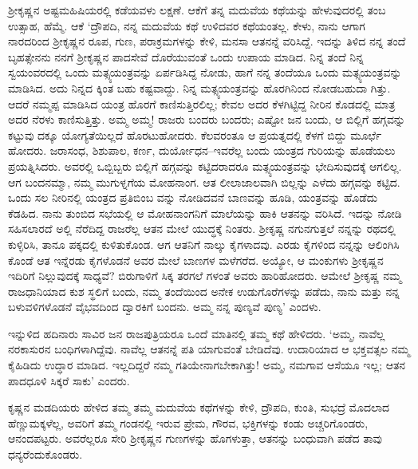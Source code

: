 ಶ್ರೀಕೃಷ್ಣನ ಅಷ್ಟಮಹಿಷಿಯರಲ್ಲಿ ಕಡೆಯವಳು ಲಕ್ಷಣೆ. ಆಕೆಗೆ ತನ್ನ ಮದುವೆಯ ಕಥೆಯನ್ನು ಹೇಳುವುದರಲ್ಲಿ ತಂಬ ಉತ್ಸಾಹ, ಹೆಮ್ಮೆ. ಆಕೆ ‘ದ್ರೌಪದಿ, ನನ್ನ ಮದುವೆಯ ಕಥೆ ಉಳಿದವರ ಕಥೆಯಂತಲ್ಲ. ಕೇಳು, ನಾನು ಆಗಾಗ ನಾರದರಿಂದ ಶ್ರೀಕೃಷ್ಣನ ರೂಪ, ಗುಣ, ಪರಾಕ್ರಮಗಳನ್ನು ಕೇಳಿ, ಮನಸಾ ಆತನನ್ನೆ ವರಿಸಿದ್ದೆ. ಇದನ್ನು ತಿಳಿದ ನನ್ನ ತಂದೆ ಬೃಹತ್ಸೇನನು ನನಗೆ ಶ್ರೀಕೃಷ್ಣನ ಪಾದಸೇವೆ ದೊರೆಯುವಂತೆ ಒಂದು ಉಪಾಯ ಮಾಡಿದ. ನಿನ್ನ ತಂದೆ ನಿನ್ನ ಸ್ವಯಂವರದಲ್ಲಿ ಒಂದು ಮತ್ಸ್ಯಯಂತ್ರವನ್ನು ಏರ್ಪಡಿಸಿದ್ದ ನೋಡು, ಹಾಗೆ ನನ್ನ ತಂದೆಯೂ ಒಂದು ಮತ್ಸ್ಯಯಂತ್ರವನ್ನು ಮಾಡಿಸಿದ. ಅದು ನಿನ್ನದ ಕ್ಕಿಂತ ಬಹು ಕಷ್ಟವಾದ್ದು. ನಿನ್ನ ಮತ್ಸ್ಯಯಂತ್ರವನ್ನು ಹೊರಗಿನಿಂದ ನೋಡಬಹುದಾ ಗಿತ್ತು. ಆದರೆ ನಮ್ಮಪ್ಪ ಮಾಡಿಸಿದ ಯಂತ್ರ ಹೊರಗೆ ಕಾಣಿಸುತ್ತಿರಲಿಲ್ಲ; ಕೇವಲ ಅದರ ಕೆಳಗಿಟ್ಟಿದ್ದ ನೀರಿನ ಕೊಡದಲ್ಲಿ ಮಾತ್ರ ಅದರ ನೆರಳು ಕಾಣಿಸುತ್ತಿತ್ತು. ಅಮ್ಮ ಅಮ್ಮ! ರಾಜರು ಬಂದರು ಬಂದರು; ಎಷ್ಟೋ ಜನ ಬಂದು, ಆ ಬಿಲ್ಲಿಗೆ ಹಗ್ಗವನ್ನು ಕಟ್ಟುವು ದಕ್ಕೂ ಯೋಗ್ಯತೆಯಿಲ್ಲದೆ ಹೊರಟುಹೋದರು. ಕೆಲವರಂತೂ ಆ ಪ್ರಯತ್ನದಲ್ಲಿ ಕೆಳಗೆ ಬಿದ್ದು ಮೂರ್ಛೆ ಹೋದರು. ಜರಾಸಂಧ, ಶಿಶುಪಾಲ, ಕರ್ಣ, ದುರ್ಯೋಧನ–ಇವರೆಲ್ಲ ಬಂದು ಯಂತ್ರದ ಗುರಿಯನ್ನು ಹೊಡೆಯಲು ಪ್ರಯತ್ನಿಸಿದರು. ಅವರಲ್ಲಿ ಒಬ್ಬಿಬ್ಬರು ಬಿಲ್ಲಿಗೆ ಹಗ್ಗವನ್ನು ಕಟ್ಟಿದರಾದರೂ ಮತ್ಸ್ಯಯಂತ್ರವನ್ನು ಭೇದಿಸುವುದಕ್ಕೆ ಆಗಲಿಲ್ಲ. ಆಗ ಬಂದನಮ್ಮಾ, ನಮ್ಮ ಮುಗುಳ್ನಗೆಯ ಮೋಹನಾಂಗ. ಆತ ಲೀಲಾಜಾಲವಾಗಿ ಬಿಲ್ಲನ್ನು ಎಳೆದು ಹಗ್ಗವನ್ನು ಕಟ್ಟಿದ. ಒಂದು ಸಲ ನೀರಿನಲ್ಲಿ ಯಂತ್ರದ ಪ್ರತಿಬಿಂಬ ವನ್ನು ನೋಡಿದವನೆ ಬಾಣವನ್ನು ಹೂಡಿ, ಯಂತ್ರವನ್ನು ಹೊಡೆದು ಕೆಡಹಿದ. ನಾನು ತುಂಬಿದ ಸಭೆಯಲ್ಲಿ ಆ ಮೋಹನಾಂಗನಿಗೆ ಮಾಲೆಯನ್ನು ಹಾಕಿ ಆತನನ್ನು ವರಿಸಿದೆ. ಇದನ್ನು ನೋಡಿ ಸಹಿಸಲಾರದೆ ಅಲ್ಲಿ ನೆರೆದಿದ್ದ ರಾಜರೆಲ್ಲ ಆತನ ಮೇಲೆ ಯುದ್ಧಕ್ಕೆ ನಿಂತರು. ಶ್ರೀಕೃಷ್ಣ ನಗುನಗುತ್ತಲೆ ನನ್ನನ್ನು ರಥದಲ್ಲಿ ಕುಳ್ಳಿರಿಸಿ, ತಾನೂ ಪಕ್ಕದಲ್ಲಿ ಕುಳಿತುಕೊಂಡ. ಆಗ ಆತನಿಗೆ ನಾಲ್ಕು ಕೈಗಳಾದವು. ಎರಡು ಕೈಗಳಿಂದ ನನ್ನನ್ನು ಆಲಿಂಗಿಸಿ ಕೊಂಡೆ ಆತ ಇನ್ನೆರಡು ಕೈಗಳೊಡನೆ ಅವರ ಮೇಲೆ ಬಾಣಗಳ ಮಳೆಗರೆದ. ಅಯ್ಯೋ, ಆ ಮಂಕುಗಳು ಶ್ರೀಕೃಷ್ಣನ ಇದಿರಿಗೆ ನಿಲ್ಲುವುದಕ್ಕೆ ಸಾಧ್ಯವೆ? ಬಿರುಗಾಳಿಗೆ ಸಿಕ್ಕ ತರಗಲೆ ಗಳಂತೆ ಅವರು ಹಾರಿಹೋದರು. ಆಮೇಲೆ ಶ್ರೀಕೃಷ್ಣ ನಮ್ಮ ರಾಜಧಾನಿಯಾದ ಕುಶ ಸ್ಥಲಿಗೆ ಬಂದು, ನಮ್ಮ ತಂದೆಯಿಂದ ಅನೇಕ ಉಡುಗೊರೆಗಳನ್ನು ಪಡೆದು, ನಾನು ಮತ್ತು ನನ್ನ ಬಳುವಳಿಗಳೊಡನೆ ವೈಭವದಿಂದ ದ್ವಾರಕಿಗೆ ಬಂದನು. ಅಮ್ಮ ನನ್ನ ಪುಣ್ಯವೆ ಪುಣ್ಯ’ ಎಂದಳು.

ಇನ್ನುಳಿದ ಹದಿನಾರು ಸಾವಿರ ಜನ ರಾಜಪುತ್ರಿಯರೂ ಒಂದೆ ಮಾತಿನಲ್ಲಿ ತಮ್ಮ ಕಥೆ ಹೇಳಿದರು. ‘ಅಮ್ಮ, ನಾವೆಲ್ಲ ನರಕಾಸುರನ ಬಂಧಿಗಳಾಗಿದ್ದೆವು. ನಾವೆಲ್ಲ ಆತನನ್ನೆ ಪತಿ ಯಾಗುವಂತೆ ಬೇಡಿದೆವು. ಉದಾರಿಯಾದ ಆ ಭಕ್ತವತ್ಸಲ ನಮ್ಮ ಕೈಹಿಡಿದು ಉದ್ಧಾರ ಮಾಡಿದ. ಇಲ್ಲದಿದ್ದರೆ ನಮ್ಮ ಗತಿಯೇನಾಗಬೇಕಾಗಿತ್ತು! ಅಮ್ಮ, ನಮಗಾವ ಆಸೆಯೂ ಇಲ್ಲ; ಆತನ ಪಾದಧೂಳಿ ಸಿಕ್ಕರೆ ಸಾಕು’ ಎಂದರು.

ಕೃಷ್ಣನ ಮಡದಿಯರು ಹೇಳಿದ ತಮ್ಮ ತಮ್ಮ ಮದುವೆಯ ಕಥೆಗಳನ್ನು ಕೇಳಿ, ದ್ರೌಪದಿ, ಕುಂತಿ, ಸುಭದ್ರೆ ಮೊದಲಾದ ಹೆಣ್ಣುಮಕ್ಕಳೆಲ್ಲ, ಅವರಿಗೆ ತಮ್ಮ ಗಂಡನಲ್ಲಿ ಇರುವ ಪ್ರೇಮ, ಗೌರವ, ಭಕ್ತಿಗಳನ್ನು ಕಂಡು ಅಚ್ಚರಿಗೊಂಡರು, ಆನಂದಪಟ್ಟರು. ಅವರೆಲ್ಲರೂ ಸೇರಿ ಶ್ರೀಕೃಷ್ಣನ ಗುಣಗಳನ್ನು ಹೊಗಳುತ್ತಾ, ಆತನನ್ನು ಬಂಧುವಾಗಿ ಪಡೆದ ತಾವು ಧನ್ಯರೆಂದುಕೊಂಡರು.

